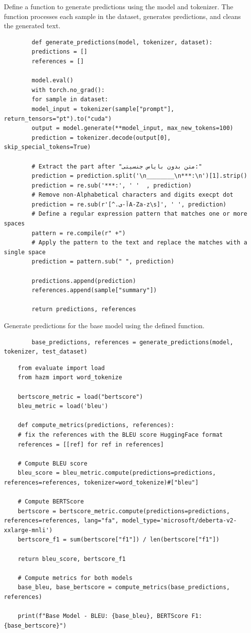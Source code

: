 \documentclass{solutionclass} %
\begin{document}
\begin{solution}
	Define a function to generate predictions using the model and tokenizer. The function processes each sample in the dataset, generates predictions, and cleans the generated text.
	\begin{lstlisting}
		def generate_predictions(model, tokenizer, dataset):
		predictions = []
		references = []
		
		model.eval()
		with torch.no_grad():
		for sample in dataset:
		model_input = tokenizer(sample["prompt"], return_tensors="pt").to("cuda")
		output = model.generate(**model_input, max_new_tokens=100)
		prediction = tokenizer.decode(output[0], skip_special_tokens=True)
		
		# Extract the part after "متن بدون بایاس جنسیتی:"
		prediction = prediction.split('\n________\n***:\n')[1].strip()
		prediction = re.sub('***:', ' '  , prediction)
		# Remove non-Alphabetical characters and digits execpt dot
		prediction = re.sub(r'[^.آ-یA-Za-z\s]', ' ', prediction)
		# Define a regular expression pattern that matches one or more spaces
		pattern = re.compile(r" +")
		# Apply the pattern to the text and replace the matches with a single space
		prediction = pattern.sub(" ", prediction)
		
		predictions.append(prediction)
		references.append(sample["summary"])
		
		return predictions, references
	\end{lstlisting}
\end{solution}

\begin{solution}
	Generate predictions for the base model using the defined function.
	\begin{lstlisting}
		base_predictions, references = generate_predictions(model, tokenizer, test_dataset)
	\end{lstlisting}
\end{solution}

\begin{lstlisting}
	from evaluate import load
	from hazm import word_tokenize
	
	bertscore_metric = load("bertscore")
	bleu_metric = load('bleu')
	
	def compute_metrics(predictions, references):
	# fix the references with the BLEU score HuggingFace format
	references = [[ref] for ref in references]
	
	# Compute BLEU score
	bleu_score = bleu_metric.compute(predictions=predictions, references=references, tokenizer=word_tokenize)#["bleu"]
	
	# Compute BERTScore
	bertscore = bertscore_metric.compute(predictions=predictions, references=references, lang="fa", model_type='microsoft/deberta-v2-xxlarge-mnli')
	bertscore_f1 = sum(bertscore["f1"]) / len(bertscore["f1"])
	
	return bleu_score, bertscore_f1
	
	# Compute metrics for both models
	base_bleu, base_bertscore = compute_metrics(base_predictions, references)
	
	print(f"Base Model - BLEU: {base_bleu}, BERTScore F1: {base_bertscore}")
\end{lstlisting}
\end{document}
